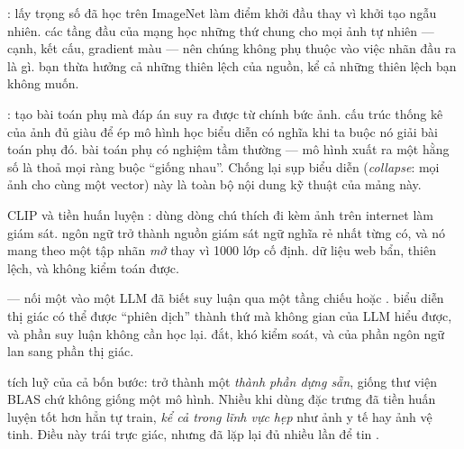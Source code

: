 \documentclass[../../../deep_learning.tex]{subfiles}
\begin{document}
\begin{mach}
\item {} \gp {}: lấy trọng số đã học trên ImageNet \cite{deng2009imagenet} làm điểm khởi đầu thay vì khởi tạo ngẫu nhiên. \gd các tầng đầu của mạng học những thứ chung cho mọi ảnh tự nhiên --- cạnh, kết cấu, gradient màu --- nên chúng không phụ thuộc vào việc nhãn đầu ra là gì. \gia bạn thừa hưởng cả những thiên lệch của nguồn, kể cả những thiên lệch bạn không muốn.
\item {} \gp {}: tạo bài toán phụ mà đáp án suy ra được từ chính bức ảnh. \gd cấu trúc thống kê của ảnh đủ giàu để ép mô hình học biểu diễn có nghĩa khi ta buộc nó giải bài toán phụ đó. \vdm bài toán phụ có nghiệm tầm thường --- mô hình xuất ra một hằng số là thoả mọi ràng buộc ``giống nhau''. Chống lại sụp biểu diễn (\emph{collapse}: mọi ảnh cho cùng một vector) này là toàn bộ nội dung kỹ thuật của mảng này.
\item {} \gp CLIP và tiền huấn luyện  \cite{radford2021clip}: dùng dòng chú thích đi kèm ảnh trên internet làm giám sát. \hq ngôn ngữ trở thành nguồn giám sát ngữ nghĩa rẻ nhất từng có, và nó mang theo một tập nhãn \emph{mở} thay vì 1000 lớp cố định. \gia dữ liệu web bẩn, thiên lệch, và không kiểm toán được.
\item {} \gp {} --- nối một  vào một LLM đã biết suy luận qua một tầng chiếu hoặc  \cite{li2023blip2,liu2023llava}. \gd biểu diễn thị giác có thể được ``phiên dịch'' thành thứ mà không gian  của LLM hiểu được, và phần suy luận không cần học lại. \gia đắt, khó kiểm soát, và  của phần ngôn ngữ lan sang phần thị giác.
\item \hq tích luỹ của cả bốn bước:  trở thành một \emph{thành phần dựng sẵn}, giống thư viện BLAS chứ không giống một mô hình. Nhiều khi dùng đặc trưng đã tiền huấn luyện tốt hơn hẳn tự train, \emph{kể cả trong lĩnh vực hẹp} như ảnh y tế hay ảnh vệ tinh. Điều này trái trực giác, nhưng đã lặp lại đủ nhiều lần để tin \cite{oquab2024dinov2}.
\end{mach}
\end{document}
